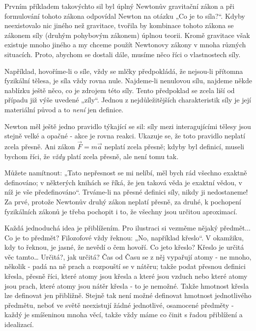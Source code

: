     Prvním příkladem takovýchto sil byl úplný Newtonův gravitační zákon a při formulování tohoto 
    zákona odpovídal Newton na otázku „Co je to síla?“. Kdyby neexistovalo nic jiného než 
    gravitace, tvořila by kombinace tohoto zákona se zákonem síly (druhým pohybovým zákonem) úplnou 
    teorii. Kromě gravitace však existuje mnoho jiného a my chceme použít Newtonovy zákony v mnoha 
    různých situacích. Proto, abychom se dostali dále, musíme něco říci o vlastnostech síly.
    
    Například, hovoříme-li o síle, vždy se mlčky předpokládá, že nejsou-li přítomna fyzikální 
    tělesa, je síla vždy rovna nule. Najdeme-li nenulovou sílu, najdeme někde nablízku ještě něco, 
    co je zdrojem této síly. Tento předpoklad se zcela liší od případu již výše uvedené „zíly“. 
    Jednou z nejdůležitějších charakteristik síly je její materiální původ a to \emph{není} jen 
    definice.
    
    Newton měl ještě jedno pravidlo týkající se sil: síly mezi interagujícími tělesy jsou stejně 
    velké a opačné - akce je rovna reakci. Ukazuje se, že toto pravidlo neplatí zcela přesně. Ani 
    zákon \(\vec{F}= m\vec{a}\) neplatí zcela přesně; kdyby byl definicí, museli bychom říci, že 
    \emph{vždy} platí zcela přesně, ale není tomu tak.
    
    Můžete namítnout: „Tato nepřesnost se mi nelíbí, měl bych rád všechno exaktně definováno; v 
    některých knihách se říká, že jen taková věda je exaktní vědou, v níž je vše předefinováno“. 
    Trváme-li na přesné definici síly, nikdy ji nedostaneme! Za prvé, protože Newtonův druhý zákon 
    neplatí přesně, za druhé, k pochopení fyzikálních zákonů je třeba pochopit i to, že všechny 
    jsou určitou aproximací.
    
    Každá jednoduchá idea je přiblížením. Pro ilustraci si vezměme nějaký předmět... Co je to 
    předmět? Filozofové vždy řeknou: „No, například křeslo“. V okamžiku, kdy to řeknou, je jasné, 
    že nevědí o čem hovoří. Co jeto křeslo? Křeslo je určitá věc tamto… Určitá?, jak určitá? Čas od 
    Času se z něj vypařují atomy - ne mnoho, několik - padá na ně prach a rozpouští se v nátěru; 
    takže podat přesnou definici křesla, přesně říci, které atomy jsou křesla a které jsou vzduch 
    nebo které atomy jsou prach, které atomy jsou nátěr křesla - to je nemožné. Takže hmotnost 
    křesla lze definovat jen přibližně. Stejně tak není možné definovat hmotnost jednotlivého 
    předmětu, neboť ve světě neexistují žádné jednotlivé, osamocené předměty - každý je smíšeninou 
    mnoha věcí, takže vždy máme co činit s řadou přiblížení a idealizací.
    
